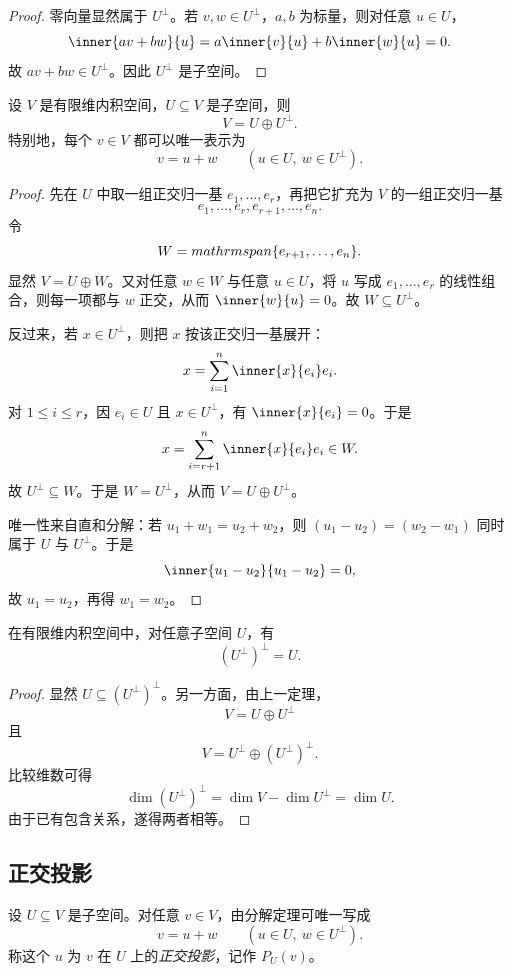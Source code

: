 \begin{proof}
零向量显然属于 $U^{\perp}$。若 $v,w\in U^{\perp}$，$a,b$ 为标量，则对任意 $u\in U$，
\[
\inner{av+bw}{u}=a\inner{v}{u}+b\inner{w}{u}=0.
\]
故 $av+bw\in U^{\perp}$。因此 $U^{\perp}$ 是子空间。
\end{proof}

\begin{theorem}
设 $V$ 是有限维内积空间，$U\subseteq V$ 是子空间，则
\[
V=U\oplus U^{\perp}.
\]
特别地，每个 $v\in V$ 都可以唯一表示为
\[
v=u+w\qquad (u\in U,\ w\in U^{\perp}).
\]
\end{theorem}

\begin{proof}
先在 $U$ 中取一组正交归一基 $e_1,\dots,e_r$，再把它扩充为 $V$ 的一组正交归一基
\[
e_1,\dots,e_r,e_{r+1},\dots,e_n.
\]
令
\[
W=\\mathrm{span}\{e_{r+1},\dots,e_n\}.
\]
显然 $V=U\oplus W$。又对任意 $w\in W$ 与任意 $u\in U$，将 $u$ 写成 $e_1,\dots,e_r$ 的线性组合，则每一项都与 $w$ 正交，从而 $\inner{w}{u}=0$。故 $W\subseteq U^{\perp}$。

反过来，若 $x\in U^{\perp}$，则把 $x$ 按该正交归一基展开：
\[
x=\sum_{i=1}^n \inner{x}{e_i}e_i.
\]
对 $1\le i\le r$，因 $e_i\in U$ 且 $x\in U^{\perp}$，有 $\inner{x}{e_i}=0$。于是
\[
x=\sum_{i=r+1}^n \inner{x}{e_i}e_i\in W.
\]
故 $U^{\perp}\subseteq W$。于是 $W=U^{\perp}$，从而 $V=U\oplus U^{\perp}$。

唯一性来自直和分解：若 $u_1+w_1=u_2+w_2$，则 $(u_1-u_2)=(w_2-w_1)$ 同时属于 $U$ 与 $U^{\perp}$。于是
\[
\inner{u_1-u_2}{u_1-u_2}=0,
\]
故 $u_1=u_2$，再得 $w_1=w_2$。
\end{proof}

\begin{corollary}
在有限维内积空间中，对任意子空间 $U$，有
\[
(U^{\perp})^{\perp}=U.
\]
\end{corollary}

\begin{proof}
显然 $U\subseteq (U^{\perp})^{\perp}$。另一方面，由上一定理，
\[
V=U\oplus U^{\perp}
\]
且
\[
V=U^{\perp}\oplus (U^{\perp})^{\perp}.
\]
比较维数可得
\[
\dim (U^{\perp})^{\perp}=\dim V-\dim U^{\perp}=\dim U.
\]
由于已有包含关系，遂得两者相等。
\end{proof}

\subsection{正交投影}

\begin{definition}
设 $U\subseteq V$ 是子空间。对任意 $v\in V$，由分解定理可唯一写成
\[
v=u+w\qquad (u\in U,\ w\in U^{\perp}).
\]
称这个 $u$ 为 $v$ 在 $U$ 上的\emph{正交投影}，记作 $P_U(v)$。
\end{definition}

